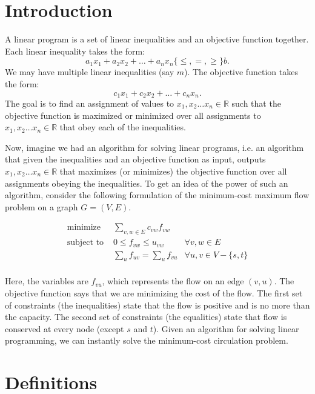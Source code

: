 \documentclass{article}
\newcommand{\reals}{\ensuremath{\mathbb{R}}}
\begin{document}
\section{Introduction}

A linear program is a set of linear inequalities and an objective
function together.  Each linear inequality takes the form:
$$a_1 x_1 + a_2 x_2 + \dots + a_n x_n \{\leq,=,\geq \} b.$$
We may have
multiple linear inequalities (say $m$).  The objective function takes
the form:
$$c_1 x_1 + c_2 x_2 + \dots + c_n x_n.$$
The goal is to find an
assignment of values to $x_1, x_2 \dots x_n \in \reals$ such that the
objective function is maximized or minimized over all assignments to $x_1, x_2
\dots x_n \in \reals$ that obey each of the inequalities.

Now, imagine we had an algorithm for solving linear programs, i.e. an
algorithm that given the inequalities and an objective function as
input, outputs $x_1, x_2 \dots x_n \in \reals$ that maximizes (or minimizes) the
objective function over all assignments obeying the inequalities.  To
get an idea of the power of such an algorithm, consider
the following formulation of the minimum-cost maximum flow problem on a
graph $G=(V,E)$.

\begin{eqnarray*}
  \textrm{minimize } & \sum_{v,w \in E} c_{vw} f_{vw} &\\
  \textrm{subject to } &0 \leq f_{vw} \leq u_{vw} & \forall v,w \in E\\
  & \sum_u{f_{u v}} = \sum_u{f_{v u}} & \forall u,v \in V-\{s,t\}\\
\end{eqnarray*}

Here, the variables are $f_{vu}$, which represents the flow on an edge
$(v,u)$.  The objective function says that we are minimizing the cost
of the flow.  The first set of constraints (the inequalities) state that the flow is positive and is no
more than the capacity.  The second set of constraints (the equalities) state that flow is conserved at every node (except $s$ and $t$). Given an algorithm for solving linear programming, we can instantly solve the minimum-cost circulation problem.

\section{Definitions}
\end{document}
